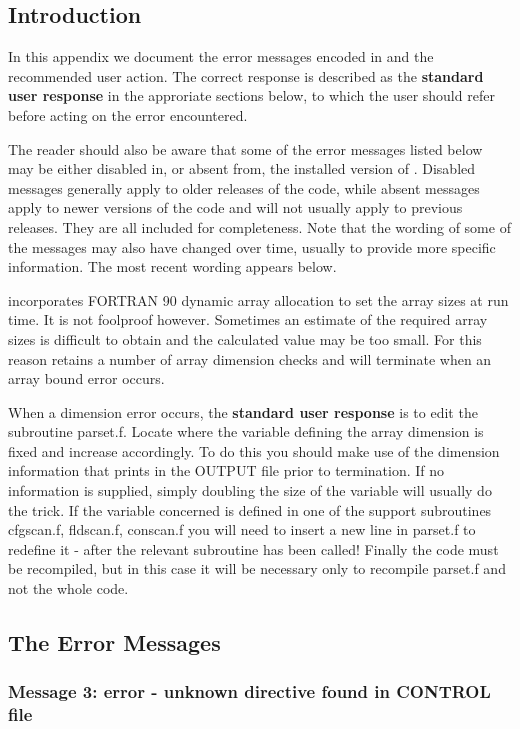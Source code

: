 \label{A2} 
\subsection*{Introduction}
In this appendix we document the error messages encoded in \D{} and the recommended user action. 
The correct response is described as the {\bf standard user
response} in the approriate sections below, to which the user should
refer before acting on the error encountered.

The reader should also be aware that some of the error messages listed
below may be either disabled in, or absent from, the installed version
of \D{}. Disabled messages generally apply to older releases of the
code, while absent messages apply to newer versions of the code and
will not usually apply to previous releases.  They are all included
for completeness. Note that the wording of some of the messages may
also have changed over time, usually to provide more specific
information. The most recent wording appears below.

\D{} incorporates FORTRAN 90 dynamic array allocation to set
the array sizes at run time. It is not foolproof however. Sometimes an
estimate of the required array sizes is difficult to obtain and the
calculated value may be too small. For this reason \D{} retains a number
of array dimension checks and will terminate when an array bound error
occurs.

When a dimension error occurs, the {\bf standard user response} is to
edit the \D{} subroutine {\sc parset.f}. Locate where the variable
defining the array dimension is fixed and increase accordingly. To do
this you should make use of the dimension information that \D{} prints in
the OUTPUT file prior to termination. If no information is supplied,
simply doubling the size of the variable will usually do the trick.
If the variable concerned is defined in one of the support subroutines
{\sc cfgscan.f, fldscan.f, conscan.f} you will need to insert a new
line in {\sc parset.f} to redefine it - after the relevant subroutine
has been called! Finally the code must be recompiled, but in this case
it will be necessary only to recompile {\sc parset.f} and not the
whole code.

\subsection*{The \D{} Error Messages}

\subsubsection*{Message 3: error - unknown directive found in CONTROL
file}

